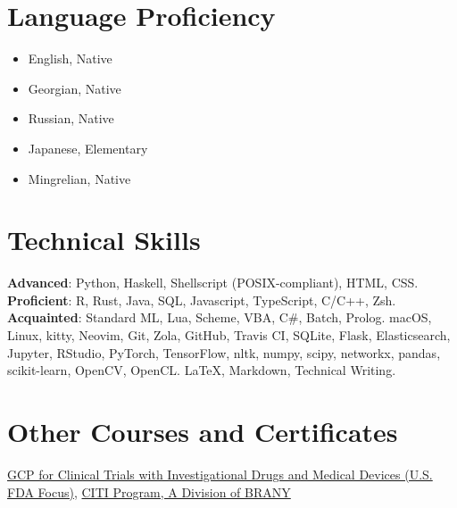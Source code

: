 \documentclass[a4paper,10pt,sans]{moderncv}
\begin{document}


\section{Language Proficiency}
\hspace*{\fill}
\begin{minipage}{\maincolumnwidth}
  \begin{multicols}{3}
    \begin{itemize}
      \item English, Native
      \item Georgian, Native
    \end{itemize}
    \columnbreak%
    \begin{itemize}
      \item Russian, Native
      \item Japanese, Elementary
    \end{itemize}
    \columnbreak%
    \begin{itemize}
      \item Mingrelian, Native
    \end{itemize}
  \end{multicols}
\end{minipage}



\section{Technical Skills}
         {\textbf{Advanced}: Python, Haskell, Shellscript (POSIX-compliant), HTML, CSS.\newline
          \textbf{Proficient}: R, Rust, Java, SQL, Javascript, TypeScript, C/C++, Zsh.\newline
          \textbf{Acquainted}: Standard ML, Lua, Scheme, VBA, C\#, Batch, Prolog.}
         {macOS, Linux, kitty, Neovim, Git, Zola, GitHub, Travis CI, SQLite,
          Flask, Elasticsearch, Jupyter, RStudio, PyTorch, TensorFlow, nltk,
          numpy, scipy, networkx, pandas, scikit-learn, OpenCV, OpenCL.}
         {\LaTeX, Markdown, Technical Writing.}



\section{Other Courses and Certificates}
         {\href{https://www.citiprogram.org/verify/?wbdb4adae-c0f7-4b2d-95c9-979fffad5efa-35263396}{GCP for Clinical Trials with Investigational Drugs and Medical Devices (U.S. FDA Focus)}, \href{https://about.citiprogram.org/en/homepage/}{CITI Program, A Division of BRANY}}
\end{document}
